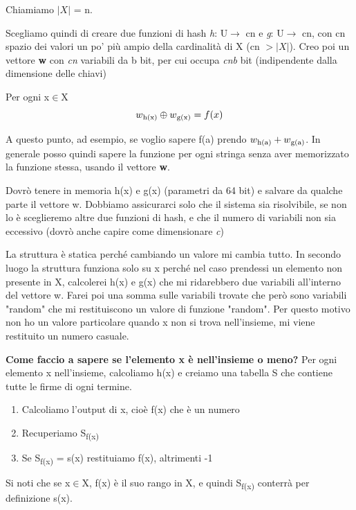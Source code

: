 \documentclass[12pt,italian]{report}
\begin{document}
\noindent Chiamiamo $|X|$ = n.

\noindent Scegliamo quindi di creare due funzioni di hash \textit{h}: U$\to$ cn e \textit{g}: U$\to$ cn, con cn spazio dei valori un po' più ampio della cardinalità di X (cn $> |X|$). Creo poi un vettore \textbf{w} con \textit{cn} variabili da b bit, per cui occupa \textit{cnb} bit (indipendente dalla dimensione delle chiavi)

\noindent Per ogni x$\in$X 
\begin{equation}
    w\textsubscript{h(x)} \oplus w\textsubscript{g(x)} = f(x)
\end{equation}
\bigbreak

\noindent A questo punto, ad esempio, se voglio sapere f(a) prendo $ w\textsubscript{h(a)} + w\textsubscript{g(a)}$. In generale posso quindi sapere la funzione per ogni stringa senza aver memorizzato la funzione stessa, usando il vettore \textbf{w}.

\bigbreak
\noindent Dovrò tenere in memoria h(x) e g(x) (parametri da 64 bit) e salvare da qualche parte il vettore w. Dobbiamo assicurarci solo che il sistema sia risolvibile, se non lo è sceglieremo altre due funzioni di hash, e che il numero di variabili non sia eccessivo (dovrò anche capire come dimensionare \textit{c})

\bigbreak
\noindent La struttura è statica perché cambiando un valore mi cambia tutto. In secondo luogo la struttura funziona solo su x perché nel caso prendessi un elemento non presente in X, calcolerei h(x) e g(x) che mi ridarebbero due variabili all'interno del vettore w. Farei poi una somma sulle variabili trovate che però sono variabili "random" che mi restituiscono un valore di funzione "random". Per questo motivo non ho un valore particolare quando x non si trova nell'insieme, mi viene restituito un numero casuale.

\bigbreak
\noindent \textbf{Come faccio a sapere se l'elemento x è nell'insieme o meno?}
Per ogni elemento x nell'insieme, calcoliamo h(x) e creiamo una tabella S che contiene tutte le firme di ogni termine. 

\begin{enumerate}
    \item Calcoliamo l'output di x, cioè f(x) che è un numero
    \item Recuperiamo S\textsubscript{f(x)}
    \item Se S\textsubscript{f(x)} = s(x) restituiamo f(x), altrimenti -1
\end{enumerate}
Si noti che se x$\in$X, f(x) è il suo rango in X, e quindi S\textsubscript{f(x)} conterrà per definizione s(x).
\end{document}
